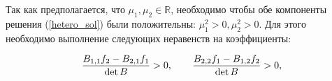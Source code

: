





Так как предполагается, что $\mu_1, \mu_2 \in \mathbb{R}$, необходимо чтобы обе компоненты решения (\ref{hetero_sol}) были положительны:  $\mu_1^2>0, \mu_2^2>0$. Для этого необходимо выполнение следующих неравенств на коэффициенты:

\begin{equation}
\frac{B_{1,1}f_2 - B_{2,1}f_1}{\det B} > 0, \\ \qquad
\frac{B_{2,2}f_1 - B_{1,2}f_2}{\det B} > 0,
\label{crit}
\end{equation}
 
